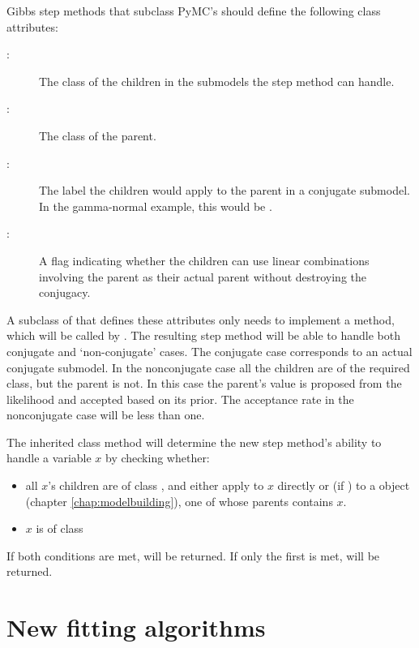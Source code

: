 Gibbs step methods that subclass PyMC's  should define the following class attributes:
\begin{description}
   \item[:] The class of the children in the submodels the step method can handle.
   \item[:] The class of the parent.
   \item[:] The label the children would apply to the parent in a conjugate submodel. In the gamma-normal example, this would be .
   \item[:] A flag indicating whether the children can use linear combinations involving the parent as their actual parent without destroying the conjugacy.
\end{description}   

A subclass of  that defines these attributes only needs to implement a  method, which will be called by . The resulting step method will be able to handle both conjugate and `non-conjugate' cases. The conjugate case corresponds to an actual conjugate submodel. In the nonconjugate case all the children are of the required class, but the parent is not. In this case the parent's value is proposed from the likelihood and accepted based on its prior. The acceptance rate in the nonconjugate case will be less than one.

The inherited class method  will determine the new step method's ability to handle a variable $x$ by checking whether: 
\begin{itemize}
   \item all $x$'s children are of class , and either apply  to $x$ directly or (if ) to a  object (chapter \ref{chap:modelbuilding}), one of whose parents contains $x$.   
   \item $x$ is of class 
\end{itemize}
If both conditions are met,  will be returned. If only the first is met,  will be returned.

\hypertarget{custom-model}{}
\section{New fitting algorithms} \label{custom-model}

